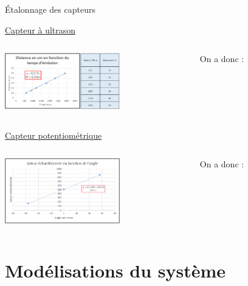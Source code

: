 \documentclass[french, handout]{beamer}
\begin{document}
    \begin{frame}{Étalonnage des capteurs}
        \label{pres_capteurs}
        \begin{block}{\hyperlink{details_ultrason}{Capteur à ultrason}}
            \begin{columns}
                \begin{column}{5cm}
                \includegraphics[width=5cm]{Etalonage_capteur_distance.png}
                \end{column}
                \begin{column}{5cm}
                    \centering
                    On a donc : \hspace{1.5\baselineskip}
                \end{column}
            \end{columns}
        \end{block}
        \begin{block}{\hyperlink{details_pot}{Capteur potentiométrique}}
            \begin{columns}
            \begin{column}{5cm}
                \includegraphics[width=5cm]{CAN-angle_etalonnage_pot.png}
                \end{column}
                \begin{column}{5cm}
                    On a donc : 
                \end{column}
            \end{columns}
        \end{block}
    \end{frame}
    \section{Modélisations du système}
\end{document}
